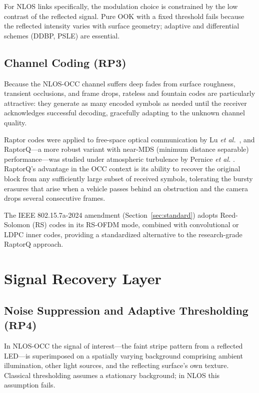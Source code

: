 \documentclass[10pt,a4paper]{article}
\newcommand{\rp}[1]{\textbf{RP#1}}
\begin{document}
For NLOS links specifically, the modulation choice is constrained by the
low contrast of the reflected signal. Pure OOK with a fixed threshold
fails because the reflected intensity varies with surface geometry;
adaptive and differential schemes (DDBP, PSLE) are essential.

\subsection{Channel Coding ($\rp{3}$)}
\label{sec:rp3}

Because the NLOS-OCC channel suffers deep fades from surface
roughness, transient occlusions, and frame drops, rateless and fountain
codes are particularly attractive: they generate as many encoded
symbols as needed until the receiver acknowledges successful decoding,
gracefully adapting to the unknown channel quality.

Raptor codes were applied to free-space optical communication by Lu
\emph{et al.}~\cite{lu2016raptor}, and RaptorQ---a more robust variant
with near-MDS (minimum distance separable) performance---was studied
under atmospheric turbulence by Pernice \emph{et al.}
\cite{pernice2016raptorq}. RaptorQ's advantage in the OCC context is
its ability to recover the original block from any sufficiently large
subset of received symbols, tolerating the bursty erasures that arise
when a vehicle passes behind an obstruction and the camera drops several
consecutive frames.

The IEEE 802.15.7a-2024 amendment (Section~\ref{sec:standard}) adopts
Reed-Solomon (RS) codes in its RS-OFDM mode, combined with convolutional
or LDPC inner codes, providing a standardized alternative to the
research-grade RaptorQ approach.

\section{Signal Recovery Layer}
\label{sec:signal}

\subsection{Noise Suppression and Adaptive Thresholding ($\rp{4}$)}
\label{sec:rp4}

In NLOS-OCC the signal of interest---the faint stripe pattern from a
reflected LED---is superimposed on a spatially varying background
comprising ambient illumination, other light sources, and the reflecting
surface's own texture. Classical thresholding assumes a stationary
background; in NLOS this assumption fails.
\end{document}
